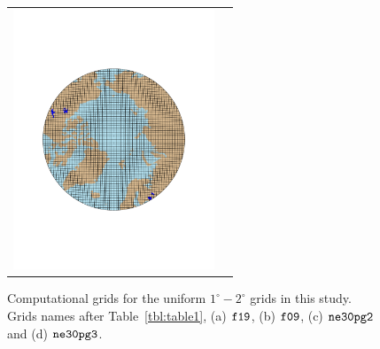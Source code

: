 \documentclass[draft]{agujournal2019}
\begin{document}
\begin{figure}[t]
\begin{center}
\begin{tabular}{cc}
         \includegraphics[width=60mm]{figs/grid-ne30pg3.pdf} \\
\end{tabular}
\end{center}
\caption{Computational grids for the uniform $1^{\circ}-2^{\circ}$ grids in this study. Grids names after Table~\ref{tbl:table1}, (a) $\tt f19$, (b) $\tt f09$, (c) $\tt ne30pg2$ and (d) $\tt ne30pg3$.}
\label{fig:uni-grids}
\end{figure}
\end{document}

